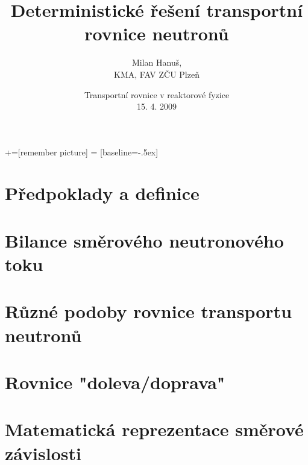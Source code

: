 \documentclass[czech]{beamer}
\begin{document}
\everymath{\displaystyle}

+=[remember picture]
 = [baseline=-.5ex]


\title{Deterministické řešení transportní rovnice neutronů}
\author{Milan Hanuš,\\[.2em]
{\small\textcolor{ltgrey}{KMA, FAV ZČU Plzeň}}}
\date[MORF 1]{{Transportní rovnice v reaktorové fyzice}\\[.2em]
{\small\textcolor{ltgrey}{15. 4. 2009}}}

\begin{frame}[label=s0]
	\titlepage
\end{frame}

\begin{frame}[allowframebreak]
 	  \tableofcontents
\end{frame}

%
  \section{Předpoklady a definice}
    
  \section{Bilance směrového neutronového toku}
    
  \section{Různé podoby rovnice transportu neutronů}
    
  \section{Rovnice "doleva/doprava"}
    
  \section{Matematická reprezentace směrové závislosti}
    
\end{document}
